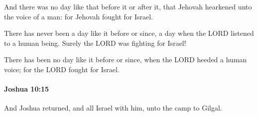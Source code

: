			\begin{versebox}
					\item[BHS] 
					\item[ASV] And there was no day like that before it or after it, that Jehovah hearkened unto the voice of a man: for Jehovah fought for Israel.
					\item[NIV] There has never been a day like it before or since, a day when the LORD listened to a human being. Surely the LORD was fighting for Israel!
					\item[NRSV] There has been no day like it before or since, when the LORD heeded a human voice; for the LORD fought for Israel.
			\end{versebox}

		\paragraph{Joshua 10:15} %
			\label{JOSHUA-10-15}

			And Joshua returned, and all Israel with him, unto the camp to Gilgal.

